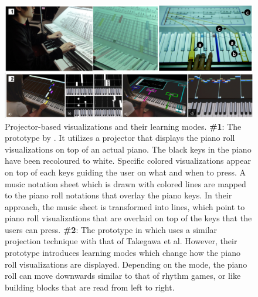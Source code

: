 \documentclass[sigchi, review]{acmart}
\begin{document}
\begin{figure}[t]
    \centering
    \includegraphics[width=18cm]{figures/projectors.png}
    \caption{Projector-based visualizations and their learning modes.  \textbf{\#1}: The prototype by \cite{takegawa2012piano}. It utilizes a projector that displays the piano roll visualizations on top of an actual piano. The black keys in the piano have been recoloured to white. Specific colored visualizations appear on top of each keys guiding the user on what and when to press. A music notation sheet which is drawn with colored lines are mapped to the piano roll notations that overlay the piano keys. In their approach, the music sheet is transformed into lines, which point to piano roll visualizations that are overlaid on top of the keys that the users can press. \textbf{\#2}: The prototype in \cite{rogers2014piano} which uses a similar projection technique with that of Takegawa et al. However, their prototype introduces learning modes which change how the piano roll visualizations are displayed. Depending on the mode, the piano roll can move downwards similar to that of rhythm games, or like building blocks that are read from left to right. }
    \label{fig:projectors}
\end{figure}
\end{document}
